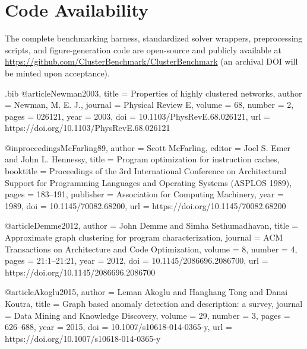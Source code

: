 \documentclass[11pt,a4paper]{article}
\begin{document}
\section*{Code Availability}
The complete benchmarking harness, standardized solver wrappers, preprocessing scripts, and figure-generation code are open-source and publicly available at \url{https://github.com/ClusterBenchmark/ClusterBenchmark} (an archival DOI will be minted upon acceptance).




\begin{filecontents*}[overwrite]{\jobname.bib}
@article{Newman2003,
  title     = {Properties of highly clustered networks},
  author    = {Newman, M. E. J.},
  journal   = {Physical Review E},
  volume    = {68},
  number    = {2},
  pages     = {026121},
  year      = {2003},
  doi       = {10.1103/PhysRevE.68.026121},
  url       = {https://doi.org/10.1103/PhysRevE.68.026121}
}

@inproceedings{McFarling89,
  author    = {Scott McFarling},
  editor    = {Joel S. Emer and John L. Hennessy},
  title     = {Program optimization for instruction caches},
  booktitle = {Proceedings of the 3rd International Conference on Architectural Support for Programming Languages and Operating Systems (ASPLOS 1989)},
  pages     = {183--191},
  publisher = {Association for Computing Machinery},
  year      = {1989},
  doi       = {10.1145/70082.68200},
  url       = {https://doi.org/10.1145/70082.68200}
}

@article{Demme2012,
  author    = {John Demme and Simha Sethumadhavan},
  title     = {Approximate graph clustering for program characterization},
  journal   = {ACM Transactions on Architecture and Code Optimization},
  volume    = {8},
  number    = {4},
  pages     = {21:1--21:21},
  year      = {2012},
  doi       = {10.1145/2086696.2086700},
  url       = {https://doi.org/10.1145/2086696.2086700}
}

@article{Akoglu2015,
  author    = {Leman Akoglu and Hanghang Tong and Danai Koutra},
  title     = {Graph based anomaly detection and description: a survey},
  journal   = {Data Mining and Knowledge Discovery},
  volume    = {29},
  number    = {3},
  pages     = {626--688},
  year      = {2015},
  doi       = {10.1007/s10618-014-0365-y},
  url       = {https://doi.org/10.1007/s10618-014-0365-y}
}


\end{filecontents*}
\end{document}
